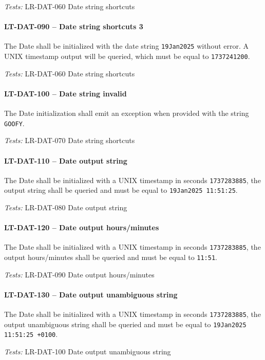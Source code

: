 \textit{Tests: } LR-DAT-060 Date string shortcuts

\paragraph{LT-DAT-090 -- Date string shortcuts 3}
The Date shall be initialized with the date string
\lstinline{19Jan2025} without error.
A UNIX timestamp output will be queried, which must be equal to
\lstinline{1737241200}.

\textit{Tests: } LR-DAT-060 Date string shortcuts

\paragraph{LT-DAT-100 -- Date string invalid}
The Date initialization shall emit an exception when provided
with the string \lstinline{GOOFY}.

\textit{Tests: } LR-DAT-070 Date string shortcuts

\paragraph{LT-DAT-110 -- Date output string}
The Date shall be initialized with a UNIX timestamp in seconds
\lstinline{1737283885}, the output string shall be queried and
must be equal to \lstinline{19Jan2025 11:51:25}.

\textit{Tests: } LR-DAT-080 Date output string

\paragraph{LT-DAT-120 -- Date output hours/minutes}
The Date shall be initialized with a UNIX timestamp in seconds
\lstinline{1737283885}, the output hours/minutes shall be queried
and must be equal to \lstinline{11:51}.

\textit{Tests: } LR-DAT-090 Date output hours/minutes

\paragraph{LT-DAT-130 -- Date output unambiguous string}
The Date shall be initialized with a UNIX timestamp in seconds
\lstinline{1737283885}, the output unambiguous string shall
be queried and must be equal to \lstinline{19Jan2025 11:51:25 +0100}.

\textit{Tests: } LR-DAT-100 Date output unambiguous string

